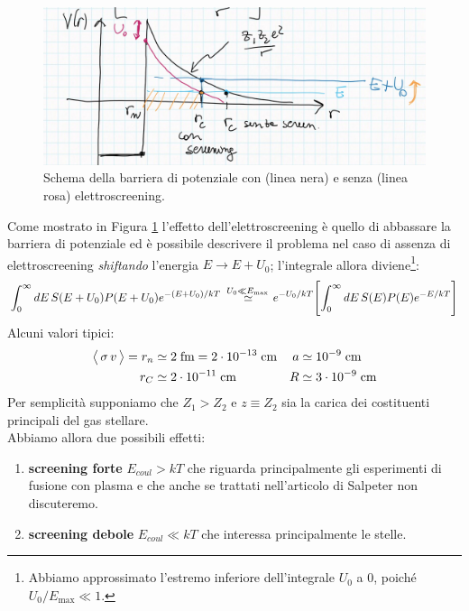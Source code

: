 \begin{figure}[!h]
    \centering
    \includegraphics[scale=0.3]{Immagini/0329_pot_ES.png}
    \caption{Schema della barriera di potenziale con (linea nera) e senza (linea rosa) elettroscreening.}
    \label{0329_schema}
\end{figure}
\noindent Come mostrato in Figura \ref{0329_schema} l'effetto dell'elettroscreening è quello di abbassare la barriera di potenziale ed è possibile descrivere il problema nel caso di assenza di elettroscreening \textit{shiftando} l'energia $E\to E+U_0$; l'integrale allora diviene\footnote{Abbiamo approssimato l'estremo inferiore dell'integrale $U_0$ a 0, poiché $U_0/E_{\max{}}\ll1$.}:
$$\int_0^\infty dE\, S(E+U_0) P(E+U_0) e^{-(E+U_0)/kT}\: \stackrel{U_0\ll E_{\max{}}}{\simeq} e^{-U_0/kT}\Biggl [ \int_0^\infty dE\, S(E) P(E) e^{-E/kT} \Biggr ]$$
Alcuni valori tipici:
\begin{displaymath}
\begin{aligned}
\bigl\langle\, \sigma\,v\, \bigr\rangle = r_n &\simeq 2\;\mbox{fm} = 2\cdot10^{-13}\;\mbox{cm} & a   &\simeq 10^{-9}\;\mbox{cm}\\
r_C &\simeq 2\cdot10^{-11}\;\mbox{cm} & R   &\simeq 3\cdot10^{-9}\;\mbox{cm}
\end{aligned}
\end{displaymath}
Per semplicità supponiamo che $Z_1>Z_2$ e $z\equiv Z_2$ sia la carica dei costituenti principali del gas stellare.\\ Abbiamo allora due possibili effetti:
\begin{enumerate}
    \item \textbf{screening forte} $E_{coul} > kT$ che riguarda principalmente gli esperimenti di fusione con plasma e che anche se trattati nell'articolo di Salpeter non discuteremo.
    \item \textbf{screening debole} $E_{coul}\ll kT$ che interessa principalmente le stelle.
\end{enumerate}

